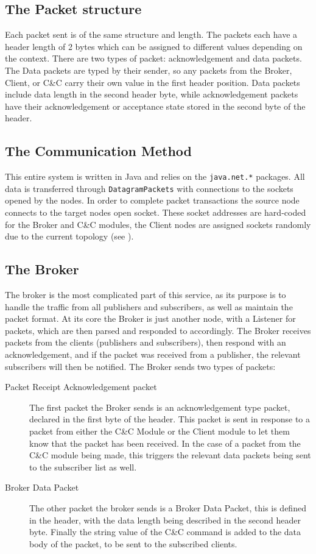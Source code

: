 \documentclass{article}
\newcommand{\code}[1]{\colorbox{light-gray}{\texttt{#1}}}
\begin{document}
    \subsection{The Packet structure}
    \label{subsec:PacketStructure}
    Each packet sent is of the same structure and length. The packets each have a header length of 2 bytes which can be assigned to different values depending on the context. There are two types of packet: acknowledgement and data packets. The Data packets are typed by their sender, so any packets from the Broker, Client, or C\&C carry their own value in the first header position. Data packets include data length in the second header byte, while acknowledgement packets have their acknowledgement or acceptance state stored in the second byte of the header.
    
    \subsection{The Communication Method}
    \label{subsec:communication}
    This entire system is written in Java and relies on the \code{java.net.*} packages. All data is transferred through \code{DatagramPackets} with connections to the sockets opened by the nodes. In order to complete packet transactions the source node connects to the target nodes open socket. These socket addresses are hard-coded for the Broker and C\&C modules, the Client nodes are assigned sockets randomly due to the current topology (see ).
    
    \subsection{The Broker}
    \label{subsec:Broker}
    The broker is the most complicated part of this service, as its purpose is to handle the traffic from all publishers and subscribers, as well as maintain the packet format. At its core the Broker is just another node, with a Listener for packets, which are then parsed and responded to accordingly. The Broker receives packets from the clients (publishers and subscribers), then respond with an acknowledgement, and if the packet was received from a publisher, the relevant subscribers will then be notified. The Broker sends two types of packets:
    \begin{description}
        \item[Packet Receipt Acknowledgement packet] The first packet the Broker sends is an acknowledgement type packet, declared in the first byte of the header. This packet is sent in response to a packet from either the C\&C Module or the Client module to let them know that the packet has been received. In the case of a packet from the C\&C module being made, this triggers the relevant data packets being sent to the subscriber list as well.
        \item[Broker Data Packet] The other packet the broker sends is a Broker Data Packet, this is defined in the header, with the data length being described in the second header byte. Finally the string value of the C\&C command is added to the data body of the packet, to be sent to the subscribed clients.
    \end{description}
    
\end{document}
